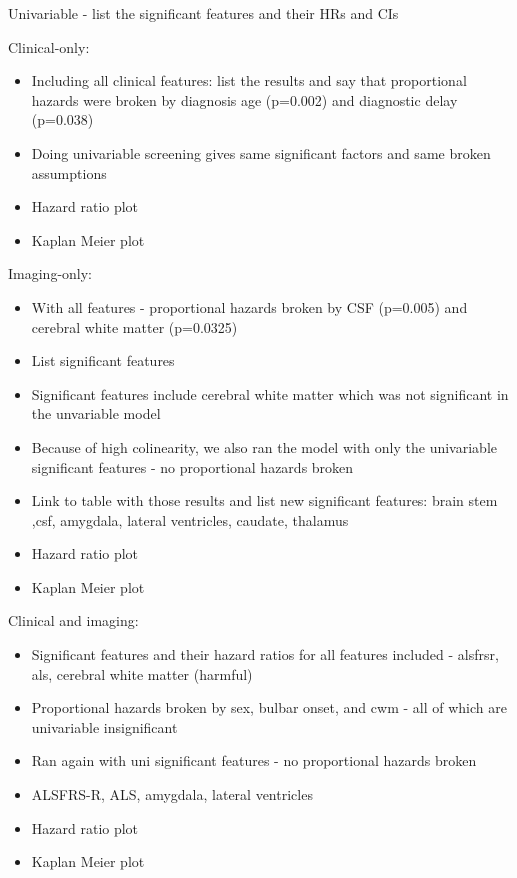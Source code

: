 Univariable
- list the significant features and their HRs and CIs

Clinical-only:
\begin{itemize}
    \item Including all clinical features: list the results and say that proportional hazards were broken by diagnosis age (p=0.002) and diagnostic delay (p=0.038)
    \item Doing univariable screening gives same significant factors and same broken assumptions
    \item Hazard ratio plot
    \item Kaplan Meier plot
\end{itemize}

Imaging-only:
\begin{itemize}
    \item With all features - proportional hazards broken by CSF (p=0.005) and cerebral white matter (p=0.0325)
    \item List significant features
    \item Significant features include cerebral white matter which was not significant in the unvariable model
    \item Because of high colinearity, we also ran the model with only the univariable significant features - no proportional hazards broken
    \item Link to table with those results and list new significant features: brain stem ,csf, amygdala, lateral ventricles, caudate, thalamus
    \item Hazard ratio plot
    \item Kaplan Meier plot
\end{itemize}

Clinical and imaging:
\begin{itemize}
    \item Significant features and their hazard ratios for all features included - alsfrsr, als, cerebral white matter (harmful)
    \item Proportional hazards broken by sex, bulbar onset, and cwm - all of which are univariable insignificant
    \item Ran again with uni significant features - no proportional hazards broken
    \item ALSFRS-R, ALS, amygdala, lateral ventricles
    \item Hazard ratio plot
    \item Kaplan Meier plot
\end{itemize}

